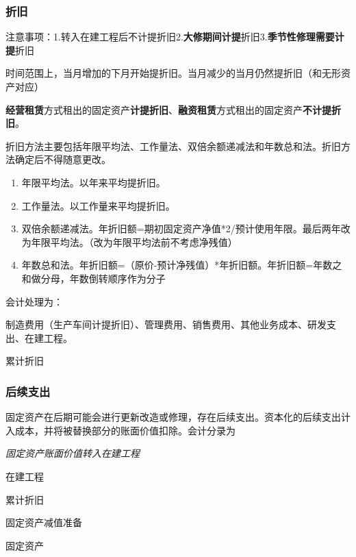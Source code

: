 \documentclass[UTF8,12pt]{ctexart}
\newenvironment{Dr}{%
	\begin{list}{}%
		{
			\setlength{\leftmargin}{2em}
			\setlength{\labelwidth}{2em}
			\setlength{\labelsep}{0pt}
			\setlength{\itemindent}{0pt}
			\setlength{\listparindent}{0pt}
			\setlength{\parsep}{0pt}
			\setlength{\topsep}{0pt}
		}
		\item[\textbf{借：}]
	}{%
	\end{list}
}
\newenvironment{Cr}{%
	\begin{list}{}%
		{
			\setlength{\leftmargin}{2em}
			\setlength{\labelwidth}{2em}
			\setlength{\labelsep}{0pt}
			\setlength{\itemindent}{0pt}
			\setlength{\listparindent}{0pt}
			\setlength{\parsep}{0pt}
			\setlength{\topsep}{0pt}
		}
		\item[\textbf{贷：}]
	}{%
	\end{list}
}
\numberwithin{equation}{section} %
\numberwithin{figure}{section}
\numberwithin{table}{section}
\begin{document}
	\subsubsection{折旧}
	注意事项：1.转入在建工程后不计提折旧2.\textbf{大修期间计提}折旧3.\textbf{季节性修理需要计提}折旧
	
	时间范围上，当月增加的下月开始提折旧。当月减少的当月仍然提折旧（和无形资产对应）
	
	\textbf{经营租赁}方式租出的固定资产\textbf{计提折旧}、\textbf{融资租赁}方式租出的固定资产\textbf{不计提折旧}。
	
	折旧方法主要包括年限平均法、工作量法、双倍余额递减法和年数总和法。折旧方法确定后不得随意更改。
	
	\begin{enumerate}
		\item 年限平均法。以年来平均提折旧。
		
		\item 工作量法。以工作量来平均提折旧。
		
		\item 双倍余额递减法。年折旧额=期初固定资产净值*2/预计使用年限。最后两年改为年限平均法。（改为年限平均法前不考虑净残值）
		
		\item 年数总和法。年折旧额=（原价-预计净残值）*年折旧额。年折旧额=年数之和做分母，年数倒转顺序作为分子
	\end{enumerate}
	
	会计处理为：
	
	\begin{Dr}
		制造费用（生产车间计提折旧）、管理费用、销售费用、其他业务成本、研发支出、在建工程。
	\end{Dr}
	\begin{Cr}
		累计折旧
	\end{Cr}
	
	\subsubsection{后续支出}
	
	固定资产在后期可能会进行更新改造或修理，存在后续支出。资本化的后续支出计入成本，并将被替换部分的账面价值扣除。会计分录为
	
	\textit{固定资产账面价值转入在建工程}
	
	\begin{Dr}
		在建工程
		
		累计折旧
		
		固定资产减值准备
	\end{Dr}
	\begin{Cr}
		固定资产
	\end{Cr}
	
\end{document}
